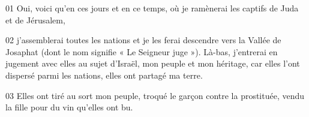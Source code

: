 01 Oui, voici qu’en ces jours et en ce temps, où je ramènerai les captifs de Juda et de Jérusalem,

02 j’assemblerai toutes les nations et je les ferai descendre vers la Vallée de Josaphat (dont le nom signifie « Le Seigneur juge »). Là-bas, j’entrerai en jugement avec elles au sujet d’Israël, mon peuple et mon héritage, car elles l’ont dispersé parmi les nations, elles ont partagé ma terre.

03 Elles ont tiré au sort mon peuple, troqué le garçon contre la prostituée, vendu la fille pour du vin qu’elles ont bu.
